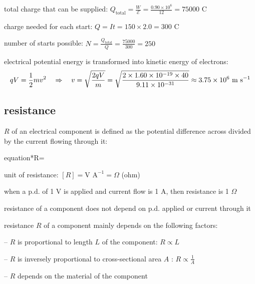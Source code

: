 \begin{soln} total charge that can be supplied: $Q_\text{total} = \frac{W}{\mathcal{E}} = \frac{0.90 \times 10^6}{12} = 75000 \text{ C}$

charge needed for each start: $Q = I t = 150 \times 2.0 = 300 \text{ C}$

number of starts possible: $N = \frac{Q_\text{total}}{Q} = \frac{75000}{300} = 250$ \end{soln}


\begin{soln} electrical potential energy is transformed into kinetic energy of electrons:
\begin{equation*}
qV = \frac{1}{2}mv^2 \quad \Rightarrow \quad v=\sqrt{\frac{2qV}{m}} = \sqrt{\frac{2 \times 1.60 \times 10^{-19} \times 40}{9.11 \times 10^{-31}}} \approx 3.75 \times 10^6 \text{ m s$^{-1}$} 
\end{equation*}
\end{soln}



\subsection{resistance}

\begin{ilight}
	 $R$ of an electrical component is defined as the potential difference across divided by the current flowing through it: \begin{empheq}[box=\tcbhighmath]{equation*}{R=} \end{empheq}
\end{ilight}


\cmt unit of resistance: $ [R] = \text{V A}^{-1} = \Omega $ (ohm)

when a p.d. of 1 V is applied and current flow is 1 A, then resistance is 1 $\Omega$

\cmt resistance of a component does not depend on p.d. applied or current through it

\cmt resistance $R$ of a component mainly depends on the following factors:

\begin{compactitem}
	\item[--] $R$ is proportional to length $L$ of the component: $R \propto L$
	
	\item[--] $R$ is inversely proportional to cross-sectional area $A$ : $R \propto \frac{1}{A}$
	
	\item[--] $R$ depends on the material of the component
\end{compactitem}

